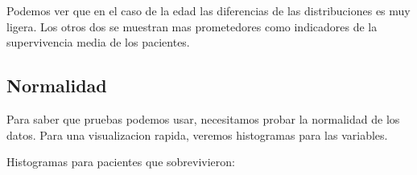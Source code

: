 \documentclass[11pt]{article}
\begin{document}
    \begin{Verbatim}[commandchars=\\\{\}]


    \end{Verbatim}

    \begin{center}
    \end{center}
    { \hspace*{\fill} \\}
    
    Podemos ver que en el caso de la edad las diferencias de las
distribuciones es muy ligera. Los otros dos se muestran mas prometedores
como indicadores de la supervivencia media de los pacientes.

\hypertarget{normalidad}{%
\subsection{Normalidad}\label{normalidad}}

Para saber que pruebas podemos usar, necesitamos probar la normalidad de
los datos. Para una visualizacion rapida, veremos histogramas para las
variables.

Histogramas para pacientes que sobrevivieron:
\end{document}
